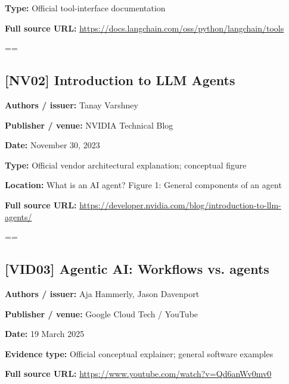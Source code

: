 \documentclass[10pt,letterpaper]{article}
\begin{document}
\textbf{Type:} Official tool-interface documentation\par
\textbf{Full source URL:} \href{https://docs.langchain.com/oss/python/langchain/tools}{\small\ttfamily https:/\allowbreak{}/\allowbreak{}docs.\allowbreak{}langchain.\allowbreak{}com/\allowbreak{}oss/\allowbreak{}python/\allowbreak{}langchain/\allowbreak{}tools}\par
\egroup\par\noindent\box\readingEntry\par\medskip
\setbox\readingEntry=\vbox\bgroup\hsize=\linewidth\subsection*{[NV02] Introduction to LLM Agents}
\textbf{Authors / issuer:} Tanay Varshney\par
\textbf{Publisher / venue:} NVIDIA Technical Blog\par
\textbf{Date:} November 30, 2023\par
\textbf{Type:} Official vendor architectural explanation; conceptual figure\par
\textbf{Location:} What is an AI agent? Figure 1: General components of an agent\par
\textbf{Full source URL:} \href{https://developer.nvidia.com/blog/introduction-to-llm-agents/}{\small\ttfamily https:/\allowbreak{}/\allowbreak{}developer.\allowbreak{}nvidia.\allowbreak{}com/\allowbreak{}blog/\allowbreak{}introduction-\allowbreak{}to-\allowbreak{}llm-\allowbreak{}agents/\allowbreak{}}\par
\egroup\par\noindent\box\readingEntry\par\medskip
\setbox\readingEntry=\vbox\bgroup\hsize=\linewidth\subsection*{[VID03] Agentic AI: Workflows vs. agents}
\textbf{Authors / issuer:} Aja Hammerly, Jason Davenport\par
\textbf{Publisher / venue:} Google Cloud Tech / YouTube\par
\textbf{Date:} 19 March 2025\par
\textbf{Evidence type:} Official conceptual explainer; general software examples\par
\textbf{Full source URL:} \href{https://www.youtube.com/watch?v=Qd6anWv0mv0}{\small\ttfamily https:/\allowbreak{}/\allowbreak{}www.\allowbreak{}youtube.\allowbreak{}com/\allowbreak{}watch?\allowbreak{}v=\allowbreak{}Qd6anWv0mv0}\par
\end{document}
